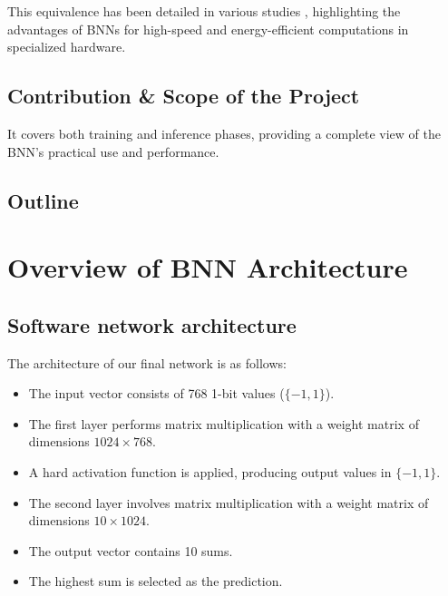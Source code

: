 \documentclass[conference,a4paper,flushend]{cs-techrep}
\begin{document}
This equivalence has been detailed in various studies \cite{placeholder_ref1, placeholder_ref2}, highlighting the advantages of BNNs for high-speed and energy-efficient computations in specialized hardware.




\subsection{Contribution \& Scope of the Project}



It covers both training and inference phases, providing a complete view of the BNN's practical use and performance.

\subsection{Outline}


\section{Overview of BNN Architecture}

\subsection{Software network architecture}
The architecture of our final network is as follows:
\begin{itemize}
    \item The input vector consists of 768 1-bit values (\(\{-1, 1\}\)).
    \item The first layer performs matrix multiplication with a weight matrix of dimensions \(1024 \times 768\).
    \item A hard activation function is applied, producing output values in \(\{-1, 1\}\).
    \item The second layer involves matrix multiplication with a weight matrix of dimensions \(10 \times 1024\).
    \item The output vector contains 10 sums.
    \item The highest sum is selected as the prediction.
\end{itemize}
\end{document}
